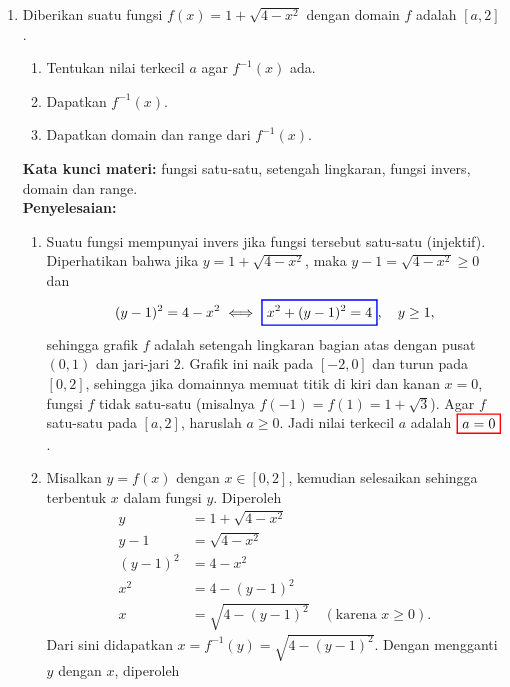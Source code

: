 \documentclass[10pt,openany,a4paper]{article}
\theoremstyle{definition}
\theoremstyle{definition}
\theoremstyle{plain}
\newenvironment{jawab}[2][tes]{%
\par\noindent\textbf{Kata kunci materi:} #1.\\
\textbf{Penyelesaian:} #2%
}{}
\begin{document}
\begin{enumerate}
    \item Diberikan suatu fungsi $f(x)=1+\sqrt{4-x^2}$ dengan domain $f$ adalah $[a,2]$.
    \begin{enumerate}
        \item Tentukan nilai terkecil $a$ agar $f^{-1}(x)$ ada.
        \item Dapatkan $f^{-1}(x)$.
        \item Dapatkan domain dan range dari $f^{-1}(x)$.
    \end{enumerate}
    \begin{jawab}[fungsi satu-satu, setengah lingkaran, fungsi invers, domain dan range]{
        \begin{enumerate}
            \item Suatu fungsi mempunyai invers jika fungsi tersebut satu-satu (injektif). Diperhatikan bahwa jika $y=1+\sqrt{4-x^2}$, maka $y-1=\sqrt{4-x^2}\geq 0$ dan
            \begin{align*}
                (y-1)^2 = 4-x^2 \iff \colorlet{oldcolor}{.}
        \color{blue}
        \setlength{\fboxrule}{1pt} \boxed{\color{oldcolor}x^2+(y-1)^2=4}\color{oldcolor},\quad y\geq 1,
            \end{align*}
            sehingga grafik $f$ adalah setengah lingkaran bagian atas dengan pusat $(0,1)$ dan jari-jari $2$. Grafik ini naik pada $[-2,0]$ dan turun pada $[0,2]$, sehingga jika domainnya memuat titik di kiri dan kanan $x=0$, fungsi $f$ tidak satu-satu (misalnya $f(-1)=f(1)=1+\sqrt{3}$). Agar $f$ satu-satu pada $[a,2]$, haruslah $a\geq 0$. Jadi nilai terkecil $a$ adalah $\colorlet{oldcolor}{.}
        \color{red}
        \setlength{\fboxrule}{1pt} \boxed{\color{oldcolor}a=0}\color{oldcolor}$.
            \item Misalkan $y=f(x)$ dengan $x\in[0,2]$, kemudian selesaikan sehingga terbentuk $x$ dalam fungsi $y$. Diperoleh
            \begin{align*}
                y &= 1+\sqrt{4-x^2}\\
                y-1 &= \sqrt{4-x^2}\\
                (y-1)^2 &= 4-x^2\\
                x^2 &= 4-(y-1)^2\\
                x &= \sqrt{4-(y-1)^2} \quad (\text{karena } x\geq 0).
            \end{align*}
            Dari sini didapatkan $x = f^{-1}(y) = \sqrt{4-(y-1)^2}$. Dengan mengganti $y$ dengan $x$, diperoleh
            \begin{align*}

\end{align*}
\end{enumerate}}
\end{jawab}
\end{enumerate}
\end{document}
